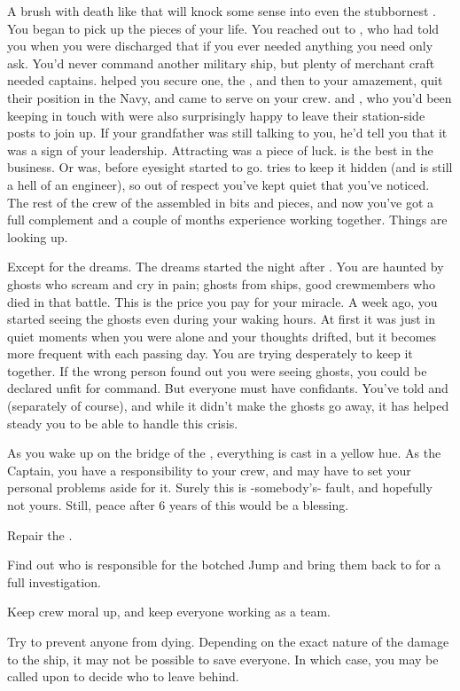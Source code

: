 \documentclass[char]{TMFHope}
\begin{document}
A brush with death like that will knock some sense into even the stubbornest \cCap{\human}. You began to pick up the pieces of your life. You reached out to \cXO{}, who had told you when you were discharged that if you ever needed anything you need only ask. You'd never command another military ship, but plenty of merchant craft needed captains. \cXO{} helped you secure one, the \pNew{}, and then to your amazement, quit their position in the Navy, and came to serve on your crew. \cMed{} and \cSci{}, who you'd been keeping in touch with were also surprisingly happy to leave their station-side posts to join up. If your grandfather was still talking to you, he'd tell you that it was a sign of your leadership. Attracting \cEng{} was a piece of luck. \cEng{\They} is the best in the business. Or was, before \cEng{\their} eyesight started to go. \cEng{} tries to keep it hidden (and \cEng{\they} is still a hell of an engineer), so out of respect you've kept quiet that you've noticed. The rest of the crew of the \pNew{} assembled in bits and pieces, and now you've got a full complement and a couple of months experience working together. Things are looking up.

Except for the dreams. The dreams started the night after \pBattle{}. You are haunted by ghosts who scream and cry in pain; ghosts from \pPlan{} ships, good crewmembers who died in that battle. This is the price you pay for your miracle.	A week ago, you started seeing the ghosts even during your waking hours. At first it was just in quiet moments when you were alone and your thoughts drifted, but it becomes more frequent with each passing day. You are trying desperately to keep it together. If the wrong person found out you were seeing ghosts, you could be declared unfit for command. But everyone must have confidants. You've told \cMed{} and \cSci{} (separately of course), and while it didn't make the ghosts go away, it has helped steady you to be able to handle this crisis. 

As you wake up on the bridge of the \pNew{}, everything is cast in a yellow hue. As the Captain, you have a responsibility to your crew, and may have to set your personal problems aside for it. Surely this is -somebody's- fault, and hopefully not yours. Still, peace after 6 years of this would be a blessing.

\begin{itemz}[Goals]
	\item Repair the \pNew{}.
	\item Find out who is responsible for the botched Jump and bring them back to \pHome{} for a full investigation.
	\item Keep crew moral up, and keep everyone working as a team.
	\item Try to prevent anyone from dying. Depending on the exact nature of the damage to the ship, it may not be possible to save everyone. In which case, you may be called upon to decide who to leave behind.
\end{itemz}
\end{document}
